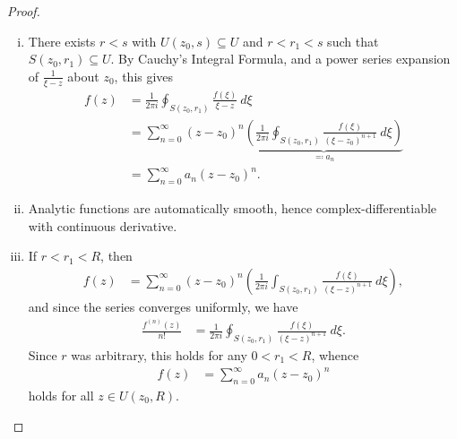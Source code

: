 \documentclass[10pt]{mypackage}
\begin{document}
\begin{proof}\hfill
  \begin{enumerate}[(i)]
    \item There exists $r < s$ with $U\left( z_0,s \right)\subseteq U$ and $r < r_1 < s$ such that $S\left( z_0,r_1 \right) \subseteq U$. By Cauchy's Integral Formula, and a power series expansion of $\frac{1}{\xi - z}$ about $z_0$, this gives
      \begin{align*}
        f(z) &= \frac{1}{2\pi i} \oint_{S\left( z_0,r_1 \right)}^{} \frac{f\left( \xi \right)}{\xi-z}\:d\xi\\
             &=\sum_{n=0}^{\infty} \left( z-z_0 \right)^n \underbrace{\left( \frac{1}{2\pi i} \oint_{S\left( z_0,r_1 \right)}^{} \frac{f\left( \xi \right)}{\left( \xi-z_0 \right)^{n+1}}\:d\xi \right)}_{\eqcolon a_n}\\
             &=\sum_{n=0}^{\infty}a_n\left( z-z_0 \right)^{n}.
      \end{align*}
    \item Analytic functions are automatically smooth, hence complex-differentiable with continuous derivative.
    \item If $r < r_1 < R$, then
      \begin{align*}
        f\left( z \right) &= \sum_{n=0}^{\infty}\left( z-z_0 \right)^{n} \left( \frac{1}{2\pi i} \int_{S\left( z_0,r_1 \right)}^{} \frac{f\left( \xi \right)}{\left( \xi-z \right)^{n+1}}\:d\xi \right),
      \end{align*}
      and since the series converges uniformly, we have
      \begin{align*}
        \frac{f^{(n)}(z)}{n!} &= \frac{1}{2\pi i} \oint_{S\left( z_0,r_1 \right)}^{} \frac{f\left( \xi \right)}{\left( \xi-z \right)^{n+1}}\:d\xi.
      \end{align*}
      Since $r$ was arbitrary, this holds for any $ 0 < r_1 < R $, whence
      \begin{align*}
        f\left( z \right) &= \sum_{n=0}^{\infty} a_n\left( z-z_0 \right)^{n}
      \end{align*}
      holds for all $z\in U\left( z_0,R \right)$.
  \end{enumerate}
\end{proof}
\end{document}
